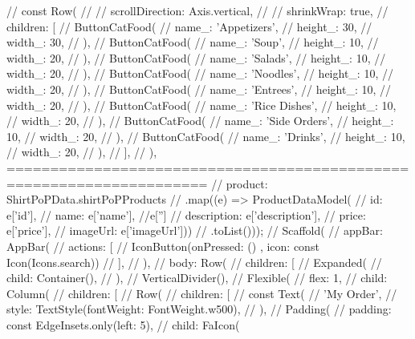 // const Row(
          //   // scrollDirection: Axis.vertical,
          //   // shrinkWrap: true,
          //   children: [
          //     ButtonCatFood(
          //       name_: 'Appetizers',
          //       height_: 30,
          //       width_: 30,
          //     ),
          //     ButtonCatFood(
          //       name_: 'Soup',
          //       height_: 10,
          //       width_: 20,
          //     ),
          //     ButtonCatFood(
          //       name_: 'Salads',
          //       height_: 10,
          //       width_: 20,
          //     ),
          //     ButtonCatFood(
          //       name_: 'Noodles',
          //       height_: 10,
          //       width_: 20,
          //     ),
          //     ButtonCatFood(
          //       name_: 'Entrees',
          //       height_: 10,
          //       width_: 20,
          //     ),
          //     ButtonCatFood(
          //       name_: 'Rice Dishes',
          //       height_: 10,
          //       width_: 20,
          //     ),
          //     ButtonCatFood(
          //       name_: 'Side Orders',
          //       height_: 10,
          //       width_: 20,
          //     ),
          //     ButtonCatFood(
          //       name_: 'Drinks',
          //       height_: 10,
          //       width_: 20,
          //     ),
          //   ],
          // ),
=====================================================================
// product: ShirtPoPData.shirtPoPProducts
//               .map((e) => ProductDataModel(
//                   id: e['id'],
//                   name: e['name'], //e['']
//                   description: e['description'],
//                   price: e['price'],
//                   imageUrl: e['imageUrl']))
//               .toList()));
// Scaffold(
//         appBar: AppBar(
//           actions: [
//             IconButton(onPressed: () {}, icon: const Icon(Icons.search))
//           ],
//         ),
//         body: Row(
//           children: [
//             Expanded(
//               child: Container(),
//             ),
//             VerticalDivider(),
//             Flexible(
//               flex: 1,
//               child: Column(
//                 children: [
//                   Row(
//                     children: [
//                       const Text(
//                         'My Order',
//                         style: TextStyle(fontWeight: FontWeight.w500),
//                       ),
//                       Padding(
//                         padding: const EdgeInsets.only(left: 5),
//                         child: FaIcon(
